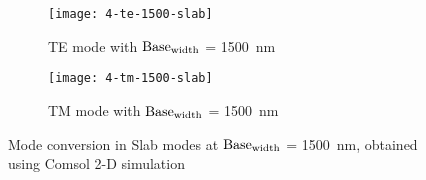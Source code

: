 \documentclass[../report.tex]{subfiles}
\begin{document}
 \begin{figure}[H] %
 	\begin{subfigure}[t]{0.45\textwidth}
 		\texttt{[image: 4-te-1500-slab]}
 		\caption{TE mode with $\mathrm{Base_{width}}$ = \SI{1500}{\nano\meter}}
 		\label{fig:4_te_1500_slab}
 	\end{subfigure}
 	\hfill
 	\begin{subfigure}[t]{0.45\textwidth}
 		\texttt{[image: 4-tm-1500-slab]}
 		\caption{TM mode with $\mathrm{Base_{width}}$ = \SI{1500}{\nano\meter}}
 		\label{fig:4_tm_1500_slab}
 	\end{subfigure}
 	\caption{Mode conversion in Slab modes at $\mathrm{Base_{width}}$ = \SI{1500}{\nano\meter}, obtained using Comsol 2-D simulation}
 \end{figure}
\end{document}
